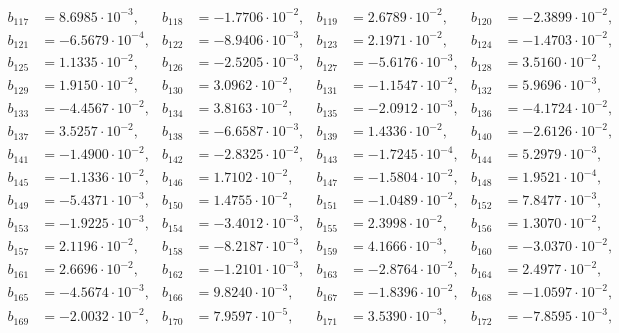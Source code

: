 \begin{align*}
b_{ 117 } &= 8.6985 \cdot 10^{ -3 }, & b_{ 118 } &= -1.7706 \cdot 10^{ -2 }, & b_{ 119 } &= 2.6789 \cdot 10^{ -2 }, & b_{ 120 } &= -2.3899 \cdot 10^{ -2 },\\ 
b_{ 121 } &= -6.5679 \cdot 10^{ -4 }, & b_{ 122 } &= -8.9406 \cdot 10^{ -3 }, & b_{ 123 } &= 2.1971 \cdot 10^{ -2 }, & b_{ 124 } &= -1.4703 \cdot 10^{ -2 },\\ 
b_{ 125 } &= 1.1335 \cdot 10^{ -2 }, & b_{ 126 } &= -2.5205 \cdot 10^{ -3 }, & b_{ 127 } &= -5.6176 \cdot 10^{ -3 }, & b_{ 128 } &= 3.5160 \cdot 10^{ -2 },\\ 
b_{ 129 } &= 1.9150 \cdot 10^{ -2 }, & b_{ 130 } &= 3.0962 \cdot 10^{ -2 }, & b_{ 131 } &= -1.1547 \cdot 10^{ -2 }, & b_{ 132 } &= 5.9696 \cdot 10^{ -3 },\\ 
b_{ 133 } &= -4.4567 \cdot 10^{ -2 }, & b_{ 134 } &= 3.8163 \cdot 10^{ -2 }, & b_{ 135 } &= -2.0912 \cdot 10^{ -3 }, & b_{ 136 } &= -4.1724 \cdot 10^{ -2 },\\ 
b_{ 137 } &= 3.5257 \cdot 10^{ -2 }, & b_{ 138 } &= -6.6587 \cdot 10^{ -3 }, & b_{ 139 } &= 1.4336 \cdot 10^{ -2 }, & b_{ 140 } &= -2.6126 \cdot 10^{ -2 },\\ 
b_{ 141 } &= -1.4900 \cdot 10^{ -2 }, & b_{ 142 } &= -2.8325 \cdot 10^{ -2 }, & b_{ 143 } &= -1.7245 \cdot 10^{ -4 }, & b_{ 144 } &= 5.2979 \cdot 10^{ -3 },\\ 
b_{ 145 } &= -1.1336 \cdot 10^{ -2 }, & b_{ 146 } &= 1.7102 \cdot 10^{ -2 }, & b_{ 147 } &= -1.5804 \cdot 10^{ -2 }, & b_{ 148 } &= 1.9521 \cdot 10^{ -4 },\\ 
b_{ 149 } &= -5.4371 \cdot 10^{ -3 }, & b_{ 150 } &= 1.4755 \cdot 10^{ -2 }, & b_{ 151 } &= -1.0489 \cdot 10^{ -2 }, & b_{ 152 } &= 7.8477 \cdot 10^{ -3 },\\ 
b_{ 153 } &= -1.9225 \cdot 10^{ -3 }, & b_{ 154 } &= -3.4012 \cdot 10^{ -3 }, & b_{ 155 } &= 2.3998 \cdot 10^{ -2 }, & b_{ 156 } &= 1.3070 \cdot 10^{ -2 },\\ 
b_{ 157 } &= 2.1196 \cdot 10^{ -2 }, & b_{ 158 } &= -8.2187 \cdot 10^{ -3 }, & b_{ 159 } &= 4.1666 \cdot 10^{ -3 }, & b_{ 160 } &= -3.0370 \cdot 10^{ -2 },\\ 
b_{ 161 } &= 2.6696 \cdot 10^{ -2 }, & b_{ 162 } &= -1.2101 \cdot 10^{ -3 }, & b_{ 163 } &= -2.8764 \cdot 10^{ -2 }, & b_{ 164 } &= 2.4977 \cdot 10^{ -2 },\\ 
b_{ 165 } &= -4.5674 \cdot 10^{ -3 }, & b_{ 166 } &= 9.8240 \cdot 10^{ -3 }, & b_{ 167 } &= -1.8396 \cdot 10^{ -2 }, & b_{ 168 } &= -1.0597 \cdot 10^{ -2 },\\ 
b_{ 169 } &= -2.0032 \cdot 10^{ -2 }, & b_{ 170 } &= 7.9597 \cdot 10^{ -5 }, & b_{ 171 } &= 3.5390 \cdot 10^{ -3 }, & b_{ 172 } &= -7.8595 \cdot 10^{ -3 },\\ 

\end{align*}
